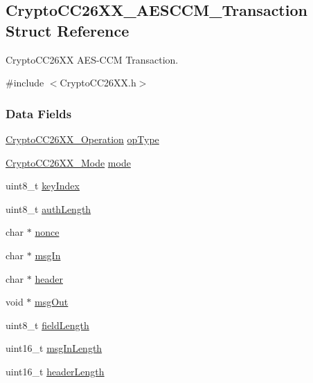 \subsection{Crypto\+C\+C26\+X\+X\+\_\+\+A\+E\+S\+C\+C\+M\+\_\+\+Transaction Struct Reference}
\label{struct_crypto_c_c26_x_x___a_e_s_c_c_m___transaction}


Crypto\+C\+C26\+X\+X A\+E\+S-\/\+C\+C\+M Transaction.  




{\ttfamily \#include $<$Crypto\+C\+C26\+X\+X.\+h$>$}

\subsubsection*{Data Fields}
\begin{DoxyCompactItemize}
\item 
\hyperlink{_crypto_c_c26_x_x_8h_a28465385e5b45efecc00f2015605f970}{Crypto\+C\+C26\+X\+X\+\_\+\+Operation} \hyperlink{struct_crypto_c_c26_x_x___a_e_s_c_c_m___transaction_a290d9a7869443690836e17e2540fc369}{op\+Type}
\item 
\hyperlink{_crypto_c_c26_x_x_8h_abf86c8ac428559f00fed3299d439e2cd}{Crypto\+C\+C26\+X\+X\+\_\+\+Mode} \hyperlink{struct_crypto_c_c26_x_x___a_e_s_c_c_m___transaction_a47c6078be481486d0dda9a9ab2685d0c}{mode}
\item 
uint8\+\_\+t \hyperlink{struct_crypto_c_c26_x_x___a_e_s_c_c_m___transaction_af0eb856eb89478eef0d83a61e52ad435}{key\+Index}
\item 
uint8\+\_\+t \hyperlink{struct_crypto_c_c26_x_x___a_e_s_c_c_m___transaction_ae543053e1c5906db60e8566764e74b22}{auth\+Length}
\item 
char $\ast$ \hyperlink{struct_crypto_c_c26_x_x___a_e_s_c_c_m___transaction_afad21bc3309b0689f288a8ee27e7a166}{nonce}
\item 
char $\ast$ \hyperlink{struct_crypto_c_c26_x_x___a_e_s_c_c_m___transaction_af14be4d0036174b871b733437fd38361}{msg\+In}
\item 
char $\ast$ \hyperlink{struct_crypto_c_c26_x_x___a_e_s_c_c_m___transaction_ab0fd5775305de978e833c66bc7e29c23}{header}
\item 
void $\ast$ \hyperlink{struct_crypto_c_c26_x_x___a_e_s_c_c_m___transaction_a75508e70a56c297c0bc4351cd586bfdc}{msg\+Out}
\item 
uint8\+\_\+t \hyperlink{struct_crypto_c_c26_x_x___a_e_s_c_c_m___transaction_a8d848bfae83f3b16e8d3a7e83a1c5694}{field\+Length}
\item 
uint16\+\_\+t \hyperlink{struct_crypto_c_c26_x_x___a_e_s_c_c_m___transaction_aa29e2771fcf7967303c7a761e23630fc}{msg\+In\+Length}
\item 
uint16\+\_\+t \hyperlink{struct_crypto_c_c26_x_x___a_e_s_c_c_m___transaction_a28e4d04c356e342908588e19011a0e5d}{header\+Length}
\end{DoxyCompactItemize}


